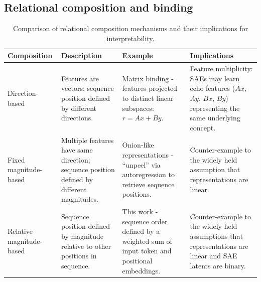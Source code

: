 

\subsection*{Relational composition and binding}

\begin{table}[t]
\centering
\caption{Comparison of relational composition mechanisms and their implications for interpretability.}
\label{tab:composition_mechanisms}
\begin{tabular}{p{3.5cm}p{4cm}p{4cm}p{4cm}}
\toprule
\textbf{Composition} & \textbf{Description} & \textbf{Example} & \textbf{Implications} \\
\midrule
Direction-based &
Features are vectors; sequence position defined by different directions.
& Matrix binding \cite{wattenberg2024relational} - features projected to distinct linear subspaces: $r = Ax + By$. &
Feature multiplicity: SAEs may learn echo features ($Ax$, $Ay$, $Bx$, $By$) representing the same underlying concept. \\
\addlinespace
Fixed magnitude-based &
Multiple features have same direction; sequence position defined by different magnitudes.
&
Onion-like representations \cite{csordas-etal-2024-recurrent} - ``unpeel'' via autoregression to retrieve sequence positions.
&
Counter-example to the widely held assumption that representations are linear.
\\
\addlinespace
Relative magnitude-based &
Sequence position defined by magnitude relative to other positions in sequence.
& This work - sequence order defined by a weighted sum of input token and positional embeddings. &
Counter-example to the widely held assumptions that representations are linear and SAE latents are binary.
\\
\bottomrule
\end{tabular}
\end{table}


